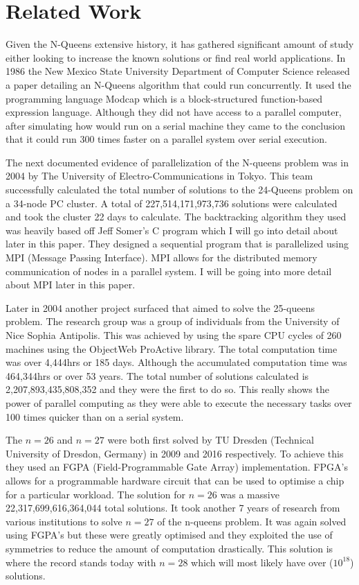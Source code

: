 \section{Related Work}\label{sec:background_relatedwork} 

Given the N-Queens extensive history, it has gathered significant amount of study either looking to increase the known solutions or find real world applications. In 1986 the New Mexico State University Department of Computer Science released a paper detailing an N-Queens algorithm that could run concurrently\cite{Silver}. It used the programming language Modcap which is a block-structured function-based expression language. Although they did not have access to a parallel computer, after simulating how would run on a serial machine they came to the conclusion that it could run 300 times faster on a parallel system over serial execution. 

The next documented evidence of parallelization of the N-queens problem was in 2004 by The University of Electro-Communications in Tokyo\cite{kenji}. This team successfully calculated the total number of solutions to the 24-Queens problem on a 34-node PC cluster. A total of 227,514,171,973,736 solutions were calculated and took the cluster 22 days to calculate. The backtracking algorithm they used was heavily based off Jeff Somer's C program which I will go into detail about later in this paper. They designed a sequential program that is parallelized using MPI (Message Passing Interface). MPI allows for the distributed memory communication of nodes in a parallel system. I will be going into more detail about MPI later in this paper. 

Later in 2004 another project surfaced that aimed to solve the 25-queens problem\cite{caromel}. The research group was a group of individuals from the University of Nice Sophia Antipolis. This was achieved by using the spare CPU cycles of 260 machines using the ObjectWeb ProActive library. The total computation time was over 4,444hrs or 185 days. Although the accumulated computation time was 464,344hrs or over 53 years. The total number of solutions calculated is 2,207,893,435,808,352 and they were the first to do so. This really shows the power of parallel computing as they were able to execute the necessary tasks over 100 times quicker than on a serial system. 

The \(n = 26\) and \(n = 27\) were both first solved by TU Dresden (Technical University of Dresdon, Germany) in 2009 and 2016 respectively\cite{thomas}. To achieve this they used an FGPA (Field-Programmable Gate Array) implementation. FPGA's allows for a programmable hardware circuit that can be used to optimise a chip for a particular workload. The solution for \(n = 26\) was a massive 22,317,699,616,364,044 total solutions. It took another 7 years of research from various institutions to solve \(n = 27\) of the n-queens problem. It was again solved using FGPA's but these were greatly optimised and they exploited the use of symmetries to reduce the amount of computation drastically. This solution is where the record stands today with \(n = 28\) which will most likely have over (\(10^{18}\)) solutions.

